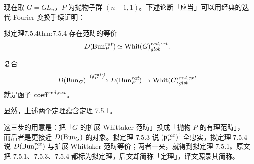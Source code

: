 现在取 $G=GL_n$，$P$ 为抛物子群 $(n-1,1)$。下述论断「应当」可以用经典的迭代 Fourier 变换手续证明：

\begin{othm}{拟定理}{7.5.4}{thm:7.5.4}
存在范畴的等价
\[
  D(\operatorname{Bun}^{rat}_P)\simeq\mathrm{Whit}(G)^{red,ext}_{glob}.
\]
\end{othm}

复合
\[
  D(\operatorname{Bun}_G)\xrightarrow{(\mathfrak{p}^{rat}_P)^!} D(\operatorname{Bun}^{rat}_P)\to\mathrm{Whit}(G)^{red,ext}_{glob}
\]
就是函子 $\mathsf{coeff}^{red,ext}$。

显然，上述两个定理蕴含定理 7.5.1。

\begin{annote}
这三步的用意是：把「$G$ 的扩展 Whittaker 范畴」换成「抛物 $P$ 的有理范畴」，而后者是更接近 $D(\operatorname{Bun}_G)$ 的对象。拟定理 7.5.3 说 $(\mathfrak{p}^{rat}_P)^!$ 全忠实，拟定理 7.5.4 说 $D(\operatorname{Bun}^{rat}_P)$ 与扩展 Whittaker 范畴等价；两者一夹，就得到拟定理 7.5.1。原文把 7.5.1、7.5.3、7.5.4 都标为拟定理，后文却简称「定理」，译文照录其简称。\par\vspace{0.15em}{\raggedleft 【来源：原书 p.16 §7.5.2（A）；译者按（把三步的逻辑关系理清）】\par}
\end{annote}
